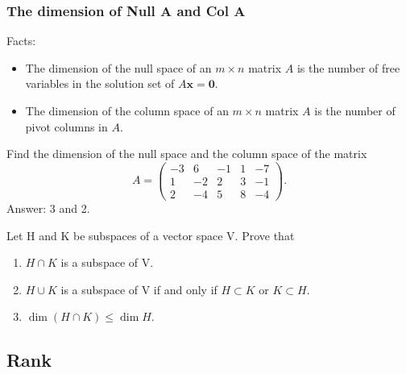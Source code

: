 \documentclass[10pt, a4paper]{article}
\newcommand{\vt}[1]{\mathbf{#1}}
\begin{document}
\subsubsection*{The dimension of Null A and Col A}
Facts:
\begin{itemize}
    \item The dimension of the null space of an $m\times n$ matrix $A$ is the number of free variables in the solution set of $A\vt{x}=\vt{0}$.
    \item The dimension of the column space of an $m\times n$ matrix $A$ is the number of pivot columns in $A$.
\end{itemize}
\begin{example}
    Find the dimension of the null space and the column space of the matrix \[
    A = \begin{pmatrix}
        -3 & 6 & -1 & 1 & -7\\
        1 & -2 & 2 & 3 & -1\\
        2 & -4 & 5 & 8 & -4
    \end{pmatrix}.
    \]
    Answer: 3 and 2.
\end{example}

\begin{example}
    Let H and K be subspaces of a vector space V. Prove that 
    \begin{enumerate}
        \item $H\cap K$ is a subspace of V.
        \item $H\cup K$ is a subspace of V if and only if $H\subset K$ or $K\subset H$.
        \item $\dim(H \cap K)\leq \dim H$.
    \end{enumerate}
\end{example}

\subsection{Rank}
\end{document}
